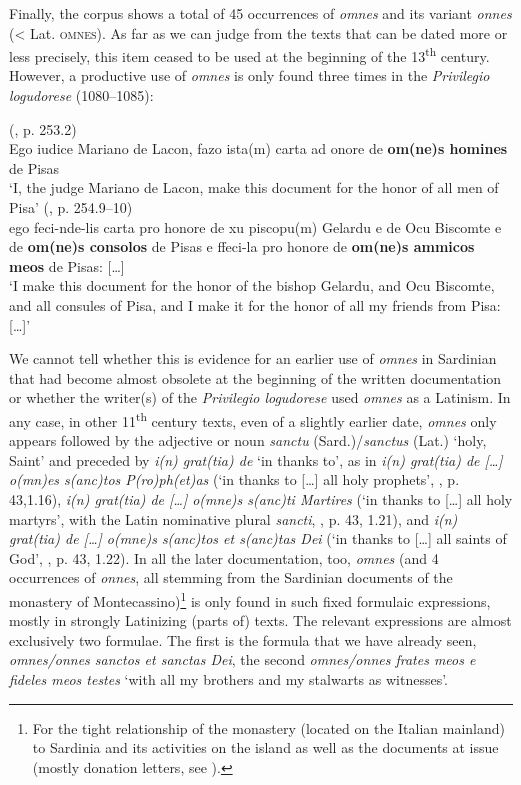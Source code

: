 \documentclass[output=paper,colorlinks,citecolor=brown]{langscibook}
\begin{document}
Finally, the corpus shows a total of 45 occurrences of \textit{omnes} and its variant \textit{onnes} (< Lat. \textsc{omnes}). As far as we can judge from the texts that can be dated more or less precisely, this item ceased to be used at the beginning of the 13\textsuperscript{th} century.  However, a productive use of \textit{omnes} is only found three times in the \textit{Privilegio logudorese} (1080--1085):

\ea\label{ex:men21}
    \ea\label{ex:men21a}(, p. 253.2)\\
     Ego iudice Mariano de Lacon, fazo ista(m) carta ad onore de \textbf{om(ne)s homines} de Pisas\\
    ‘I, the judge Mariano de Lacon, make this document for the honor of all men of Pisa’
    \ex\label{ex:men21b}(, p. 254.9–10)\\
     ego feci-nde-lis carta pro honore de xu piscopu(m) Gelardu e de Ocu Biscomte e de \textbf{om(ne)s consolos} de Pisas e ffeci-la pro honore de \textbf{om(ne)s ammicos meos} de Pisas: […]\\
    ‘I make this document for the honor of the bishop Gelardu, and Ocu Biscomte, and all consules of Pisa, and I make it for the honor of all my friends from Pisa: […]’
\z
\z

We cannot tell whether this is evidence for an earlier use of \textit{omnes} in Sardinian that had become almost obsolete at the beginning of the written documentation or whether the writer(s) of the \textit{Privilegio logudorese} used \textit{omnes} as a Latinism. In any case, in other 11\textsuperscript{th} century texts, even of a slightly earlier date, \textit{omnes} only appears followed by the adjective or noun \textit{sanctu} (Sard.)/\textit{sanctus} (Lat.) ‘holy, Saint’ and preceded by \textit{i(n) grat(tia) de} ‘in thanks to’, as in \textit{i(n) grat(tia) de […] o(mn)es s(anc)tos P(ro)ph(et)as} (‘in thanks to […] all holy prophets’, , p. 43,1.16), \textit{i(n) grat(tia) de […] o(mne)s s(anc)ti Martires} (‘in thanks to […] all holy martyrs’, with the Latin nominative plural \textit{sancti}, , p. 43, 1.21), and \textit{i(n) grat(tia) de […] o(mne)s s(anc)tos et s(anc)tas Dei} (‘in thanks to […] all saints of God’, , p. 43, 1.22). In all the later documentation, too, \textit{omnes} (and 4 occurrences of \textit{onnes}, all stemming from the Sardinian documents of the monastery of Montecassino)\footnote{For the tight relationship of the monastery (located on the Italian mainland) to Sardinia and its activities on the island as well as the documents at issue (mostly donation letters, see \cite{Saba1927}).} is only found in such fixed formulaic expressions, mostly in strongly Latinizing (parts of) texts. The relevant expressions are almost exclusively two formulae. The first is the formula that we have already seen, \textit{omnes/onnes sanctos et sanctas Dei}, the second \textit{omnes/onnes frates meos e fideles meos testes} ‘with all my brothers and my stalwarts as witnesses’.
\end{document}
